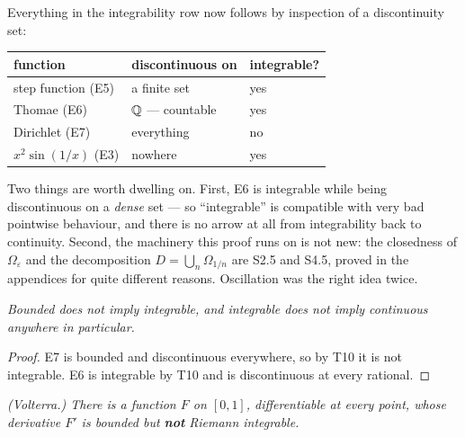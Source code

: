 \begin{deeper}
Everything in the integrability row now follows by inspection of a
discontinuity set:

\smallskip
\begin{tabular}{@{}l l l@{}}
\toprule
\textbf{function} & \textbf{discontinuous on} & \textbf{integrable?} \\
\midrule
step function (E5)   & a finite set        & yes \\
Thomae (E6)          & $\mathbb{Q}$ --- countable  & yes \\
Dirichlet (E7)       & everything          & no \\
$x^2\sin(1/x)$ (E3)  & nowhere             & yes \\
\bottomrule
\end{tabular}

\smallskip
Two things are worth dwelling on. First, E6 is integrable while being
discontinuous on a \emph{dense} set --- so ``integrable'' is compatible with
very bad pointwise behaviour, and there is no arrow at all from
integrability back to continuity. Second, the machinery this proof runs on
is not new: the closedness of $\Omega_\varepsilon$ and the decomposition
$D = \bigcup_n \Omega_{1/n}$ are S2.5 and S4.5, proved in the appendices for
quite different reasons. Oscillation was the right idea twice.
\end{deeper}

\emph{Bounded does not imply integrable, and integrable does not imply
continuous anywhere in particular.}

\begin{proof}
E7 is bounded and discontinuous everywhere, so by T10 it is not integrable.
E6 is integrable by T10 and is discontinuous at every rational.
\end{proof}


\emph{(Volterra.) There is a function $F$ on $[0,1]$, differentiable at every
point, whose derivative $F'$ is bounded but \textbf{not} Riemann integrable.}


